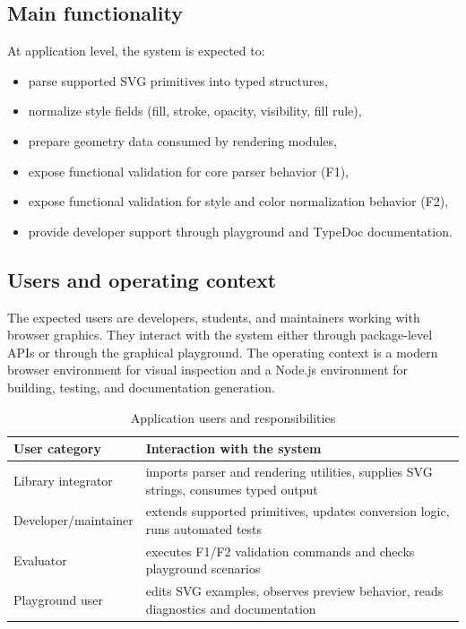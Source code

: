 \subsection{Main functionality}

At application level, the system is expected to:

\begin{itemize}
\item parse supported SVG primitives into typed structures,
\item normalize style fields (fill, stroke, opacity, visibility, fill rule),
\item prepare geometry data consumed by rendering modules,
\item expose functional validation for core parser behavior (F1),
\item expose functional validation for style and color normalization behavior (F2),
\item provide developer support through playground and TypeDoc documentation.
\end{itemize}

\subsection{Users and operating context}

The expected users are developers, students, and maintainers working with browser graphics.
They interact with the system either through package-level APIs or through the graphical playground.
The operating context is a modern browser environment for visual inspection and a Node.js environment for building, testing, and documentation generation.

\begin{table}[htbp]
\centering
\caption{Application users and responsibilities}
\label{tab:users_responsibilities}
\begin{tabular}{>{\raggedright\arraybackslash}p{3.4cm} >{\raggedright\arraybackslash}p{8.8cm}}
\toprule
\textbf{User category} & \textbf{Interaction with the system} \\
\midrule
Library integrator & imports parser and rendering utilities, supplies SVG strings, consumes typed output \\
Developer/maintainer & extends supported primitives, updates conversion logic, runs automated tests \\
Evaluator & executes F1/F2 validation commands and checks playground scenarios \\
Playground user & edits SVG examples, observes preview behavior, reads diagnostics and documentation \\
\bottomrule
\end{tabular}
\end{table}

